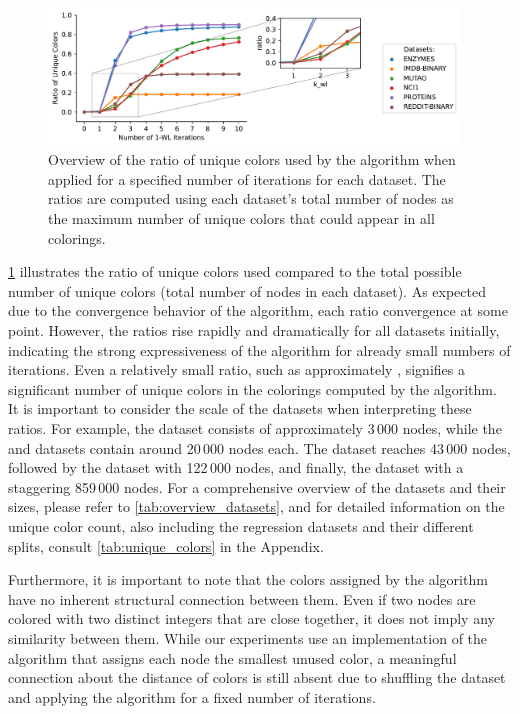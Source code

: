 \begin{figure}[!htb]
	\centering
	\includegraphics[width=0.975\textwidth]{Figures/wl_unique_colors.pdf}
	\caption{Overview of the ratio of unique colors used by the \wl algorithm when applied for a specified number of iterations for each dataset. The ratios are computed using each dataset's total number of nodes as the maximum number of unique colors that could appear in all colorings.}
	\label{fig:wl_unique_colors}
\end{figure}

\cref{fig:wl_unique_colors} illustrates the ratio of unique colors used compared to the total possible number of unique colors (total number of nodes in each dataset). As expected due to the convergence behavior of the \wl algorithm, each ratio convergence at some point. However, the ratios rise rapidly and dramatically for all datasets initially, indicating the strong expressiveness of the algorithm for already small numbers of iterations. Even a relatively small ratio, such as approximately , signifies a significant number of unique colors in the colorings computed by the \wl algorithm. It is important to consider the scale of the datasets when interpreting these ratios. For example, the \mutag dataset consists of approximately 3\,000 nodes, while the \enzymes and \imdb datasets contain around 20\,000 nodes each. The \proteins dataset reaches 43\,000 nodes, followed by the \nci dataset with 122\,000 nodes, and finally, the \reddit dataset with a staggering 859\,000 nodes. For a comprehensive overview of the datasets and their sizes, please refer to \cref{tab:overview_datasets}, and for detailed information on the unique color count, also including the regression datasets and their different splits, consult \cref{tab:unique_colors} in the Appendix.

Furthermore, it is important to note that the colors assigned by the \wl algorithm have no inherent structural connection between them. Even if two nodes are colored with two distinct integers that are close together, it does not imply any similarity between them. While our experiments use an implementation of the \wl algorithm that assigns each node the smallest unused color, a meaningful connection about the distance of colors is still absent due to shuffling the dataset and applying the \wl algorithm for a fixed number of iterations.

